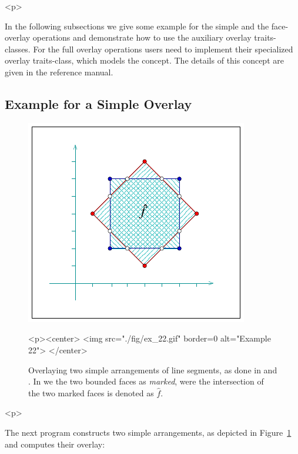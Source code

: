 \begin{ccHtmlOnly}<p>\end{ccHtmlOnly}
In the following subsections we give some example for the simple and the
face-overlay operations and demonstrate how to use the auxiliary overlay
traits-classes. For the full overlay operations users need to implement
their specialized overlay traits-class, which models the 
concept. The details of this concept are given in the reference manual.

\subsection{Example for a Simple Overlay}
\label{arr_ssec:simp_ovl}
%
\begin{figure}[!htp]
\begin{ccTexOnly}
  \begin{center}
  \includegraphics{Arrangement_2/fig/ex_22}
  \end{center}
\end{ccTexOnly}
\begin{ccHtmlOnly}
  <p><center>
  <img src="./fig/ex_22.gif" border=0 alt="Example 22">
  </center>
\end{ccHtmlOnly}
\caption{Overlaying two simple arrangements of line segments, as done
in  and . In  we 
the two bounded faces as {\em marked}, were the intersection of the two
marked faces is denoted as $\hat{f}$.}
\label{arr_fig:ex_22}
\end{figure}

\begin{ccHtmlOnly}<p>\end{ccHtmlOnly}
The next program constructs two simple arrangements, as depicted in
Figure~\ref{arr_fig:ex_22} and computes their overlay:

